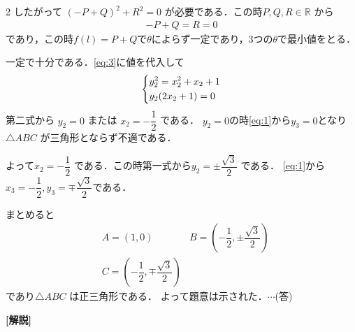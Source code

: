 \documentclass[../../main.tex]{subfiles}
\begin{document}
\begin{multicols}{2}
  したがって $(-P+Q)^2+R^2=0$ が必要である．この時$P,Q,R \in \mathbb{R}$ から
  \begin{align}
    -P+Q=R=0
  \end{align}
  であり，この時$f(l)=P+Q$で$\theta$によらず一定であり，$3$つの$\theta$で最小値をとる．

  一定で十分である．\cref{eq:3}に値を代入して
  \begin{align}
    \begin{dcases}
      y_2^2 = x_2^2+x_2+1 \\
      y_2(2x_2+1) = 0
    \end{dcases}
  \end{align}
  第二式から $y_2=0$ または $x_2=-\dfrac{1}{2}$ である．
  $y_2=0$の時\cref{eq:1}から$y_3=0$となり$\triangle ABC$ が三角形とならず不適である．

  よって$x_2=-\dfrac{1}{2}$ である．この時第一式から$y_2=\pm\dfrac{\sqrt{3}}{2}$ である．
  \cref{eq:1}から$x_3 =-\dfrac{1}{2}, y_3=\mp\dfrac{\sqrt{3}}{2}$である．

  まとめると
  \begin{align}
    & A=(1,0)
    & B=(-\dfrac{1}{2}, \pm\dfrac{\sqrt{3}}{2}) \\
    & C=(-\dfrac{1}{2}, \mp\dfrac{\sqrt{3}}{2})
  \end{align}
  であり$\triangle ABC$ は正三角形である．
  よって題意は示された．$\cdots$(答)

  {\bf [解説]}

  \newpage
\end{multicols}
\end{document}
